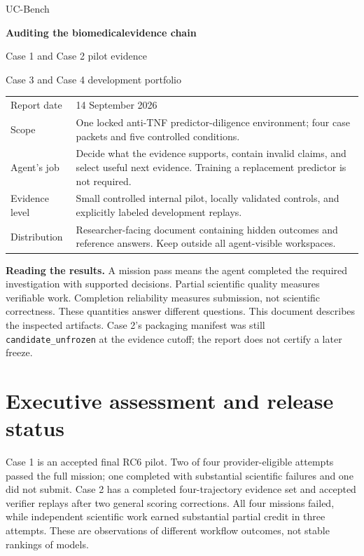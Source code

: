 \documentclass[11pt,a4paper]{article}
\begin{document}
\begin{titlepage}
\vspace*{12mm}
{\Large\color{Teal}UC-Bench\par}
\vspace{8mm}
{\Huge\bfseries\color{Ink}Auditing the biomedical\newline evidence chain\par}
\vspace{8mm}
{\Large Case 1 and Case 2 pilot evidence\par}
{\Large Case 3 and Case 4 development portfolio\par}
\vspace{12mm}
\begin{tabularx}{\textwidth}{@{}lY@{}}
\toprule
Report date & 14 September 2026 \\
Scope & One locked anti-TNF predictor-diligence environment; four case packets and five controlled conditions. \\
Agent's job & Decide what the evidence supports, contain invalid claims, and select useful next evidence. Training a replacement predictor is not required. \\
Evidence level & Small controlled internal pilot, locally validated controls, and explicitly labeled development replays. \\
Distribution & Researcher-facing document containing hidden outcomes and reference answers. Keep outside all agent-visible workspaces. \\
\bottomrule
\end{tabularx}
\vfill
\textbf{Reading the results.} A mission pass means the agent completed the required investigation with supported decisions. Partial scientific quality measures verifiable work. Completion reliability measures submission, not scientific correctness. These quantities answer different questions.
\vspace{6mm}
\textcolor{Muted}{This document describes the inspected artifacts. Case 2's packaging manifest was still \texttt{candidate\_unfrozen} at the evidence cutoff; the report does not certify a later freeze.}
\end{titlepage}
\tableofcontents
\clearpage

\section{Executive assessment and release status}

Case 1 is an accepted final RC6 pilot. Two of four provider-eligible attempts passed the full mission; one completed with substantial scientific failures and one did not submit. Case 2 has a completed four-trajectory evidence set and accepted verifier replays after two general scoring corrections. All four missions failed, while independent scientific work earned substantial partial credit in three attempts. These are observations of different workflow outcomes, not stable rankings of models.
\end{document}

